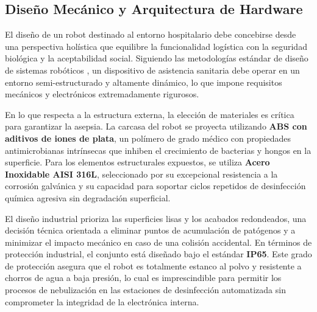 \subsection{Diseño Mecánico y Arquitectura de Hardware}
El diseño de un robot destinado al entorno hospitalario debe concebirse desde una perspectiva holística que equilibre la funcionalidad logística con la seguridad biológica y la aceptabilidad social. Siguiendo las metodologías estándar de diseño de sistemas robóticos \cite{robotshop2025}, un dispositivo de asistencia sanitaria debe operar en un entorno semi-estructurado y altamente dinámico, lo que impone requisitos mecánicos y electrónicos extremadamente rigurosos.

En lo que respecta a la estructura externa, la elección de materiales es crítica para garantizar la asepsia. La carcasa del robot se proyecta utilizando \textbf{ABS con aditivos de iones de plata}, un polímero de grado médico con propiedades antimicrobianas intrínsecas que inhiben el crecimiento de bacterias y hongos en la superficie. Para los elementos estructurales expuestos, se utiliza \textbf{Acero Inoxidable AISI 316L}, seleccionado por su excepcional resistencia a la corrosión galvánica y su capacidad para soportar ciclos repetidos de desinfección química agresiva sin degradación superficial.

El diseño industrial prioriza las superficies lisas y los acabados redondeados, una decisión técnica orientada a eliminar puntos de acumulación de patógenos y a minimizar el impacto mecánico en caso de una colisión accidental. En términos de protección industrial, el conjunto está diseñado bajo el estándar \textbf{IP65}. Este grado de protección asegura que el robot es totalmente estanco al polvo y resistente a chorros de agua a baja presión, lo cual es imprescindible para permitir los procesos de nebulización en las estaciones de desinfección automatizada sin comprometer la integridad de la electrónica interna.

